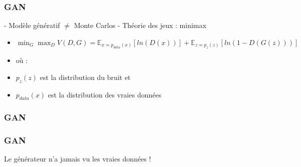 \begin{frame}
  \frametitle{GAN}
  - Modèle génératif $\neq$ Monte Carlos
  \newline
  - Théorie des jeux : minimax
  \begin{itemize}
  \item $\min_G\max_DV(D,G) = \mathbb{E}_{x\simeq p_{data}(x)}[ln(D(x))] + \mathbb{E}_{z\simeq p_{z}(z)}[ln(1 - D(G(z)))]$
  \item où :
  \item $p_{z}(z)$ est la distribution du bruit et
  \item $p_{data}(x)$ est la distribution des vraies données
  \end{itemize}
\end{frame}

\begin{frame}
  \frametitle{GAN}
  \href{https://reiinakano.github.io/gan-playground/}{}
\end{frame}

\begin{frame}
  \frametitle{GAN}
  Le générateur n'a jamais vu les vraies données !
\end{frame}
